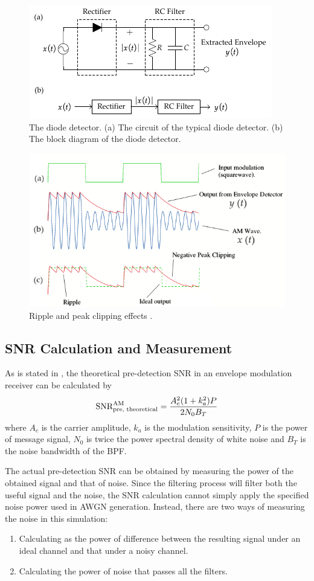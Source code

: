 \documentclass[../ECE459FinalProjectReport.tex]{subfiles}
\begin{document}
\begin{figure}[tb]
    \centering
    \includegraphics[scale=1.8]{plots/diode_detector.pdf}
    \caption{The diode detector. (a) The circuit of the typical diode detector. (b) The block diagram of the diode detector.}
    \label{fig:envelope}
\end{figure}
\begin{figure}[tb]
    \centering
    \includegraphics[width=0.7\linewidth]{plots/envelope_ripple.png}
    \caption{Ripple and peak clipping effects \cite[Fig. 9.3]{lesurfEnvelopeDetector}.}
    \label{fig:rc-ripple}
\end{figure}

\subsection{SNR Calculation and Measurement}
As is stated in \textcite[Eq. (9.26)]{haykinIntroductionAnalogDigital2007}, the theoretical pre-detection SNR in an envelope modulation receiver can be calculated by
\begin{equation}
    \text{SNR}_{\text{pre, theoretical}}^{\text{AM}} = \frac{A_c^2 (1+k_a^2)P}{2N_0 B_T}
\end{equation}
where $A_c$ is the carrier amplitude, $k_a$ is the modulation sensitivity, $P$ is the power of message signal, $N_0$ is twice the power spectral density of white noise and $B_T$ is the noise bandwidth of the BPF.

The actual pre-detection SNR can be obtained by measuring the power of the obtained signal and that of noise. Since the filtering process will filter both the useful signal and the noise, the SNR calculation cannot simply apply the specified noise power used in AWGN generation. Instead, there are two ways of measuring the noise in this simulation:
\begin{enumerate}
    \item Calculating as the power of difference between the resulting signal under an ideal channel and that under a noisy channel.
    \item Calculating the power of noise that passes all the filters.
\end{enumerate}
\end{document}
